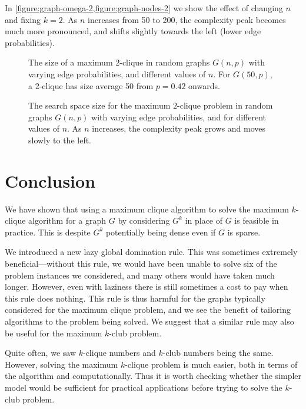\documentclass[letterpaper]{article}
\begin{document}
In \cref{figure:graph-omega-2,figure:graph-nodes-2} we show the effect of
changing $n$ and fixing $k = 2$. As $n$ increases from 50 to 200, the complexity peak becomes much
more pronounced, and shifts slightly towards the left (lower edge probabilities).

\begin{figure}[t]
    \centering
    
    \caption{The size of a maximum $2$-clique in random graphs $G(n, p)$ with varying edge
        probabilities, and different values of $n$. For $G(50, p)$, a $2$-clique has size average 50
    from $p = 0.42$ onwards.}
    \label{figure:graph-omega-2}
\end{figure}

\begin{figure}[t]
    \centering
    
    \caption{The search space size for the maximum $2$-clique problem in random graphs $G(n, p)$
        with varying edge probabilities, and for different values of $n$. As $n$ increases, the
    complexity peak grows and moves slowly to the left.}
    \label{figure:graph-nodes-2}
\end{figure}

\section{Conclusion}

We have shown that using a maximum clique algorithm to solve the maximum $k$-clique algorithm for a
graph $G$ by considering $G^k$ in place of $G$ is feasible in practice. This is despite $G^k$
potentially being dense even if $G$ is sparse.

We introduced a new lazy global domination rule. This was sometimes extremely beneficial---without
this rule, we would have been unable to solve six of the problem instances we considered, and many
others would have taken much longer. However, even with laziness there is still sometimes a cost to
pay when this rule does nothing. This rule is thus harmful for the graphs typically considered for
the maximum clique problem, and we see the benefit of tailoring algorithms to the problem being
solved. We suggest that a similar rule may also be useful for the maximum $k$-club problem.

Quite often, we saw $k$-clique numbers and $k$-club numbers being the same. However, solving the
maximum $k$-clique problem is much easier, both in terms of the algorithm and computationally. Thus
it is worth checking whether the simpler model would be sufficient for practical applications before
trying to solve the $k$-club problem.
\end{document}
